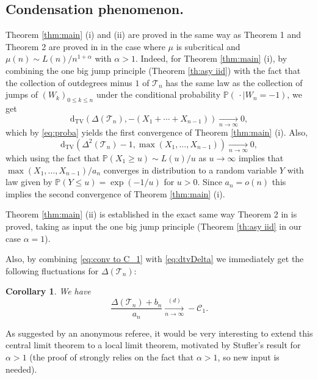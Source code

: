 \documentclass[a4paper,11pt]{article}
\DeclareRobustCommand{\P}{\mathbb{P}}
\DeclareRobustCommand{\to}{\xrightarrow[n\rightarrow \infty]{}}
\DeclareRobustCommand{\Cauchy}{\mathcal{C}_1}
\DeclareRobustCommand{\dist}{\xrightarrow[n \rightarrow \infty]{(d)}}
\DeclareRobustCommand{\dtv}{\mathrm{d}_{\mathrm{TV}}}
\newtheorem{corollary}[theorem]{Corollary}
\begin{document}
\subsection{Condensation phenomenon.} Theorem \ref{thm:main} (i) and (ii) are proved  in the same way as Theorem 1 and Theorem 2 are proved in \cite{Kortchemski_2013} in the case where $\mu$ is subcritical and $\mu(n) \sim L(n)/n^{1+\alpha}$ with $\alpha>1$. Indeed, for Theorem \ref{thm:main} (i), by combining the one big jump principle (Theorem \ref{th:asy iid}) with the fact that the collection of outdegrees minus $1$ of $ \mathcal{T}_{n}$ has the same law as the collection of jumps of $(W_{k})_{0 \leq k \leq n}$ under the conditional probability $\P(\, \cdot \mid W_{n}=-1)$, we get
\begin{equation}
\label{eq:dtvDelta}
\dtv \left( \Delta(\mathcal{T}_n), - (X_{1}+ \cdots +X_{n-1}) \right) \to 0,
\end{equation}
which by \eqref{eq:proba} yields the first convergence of Theorem \ref{thm:main} (i). Also,  
$$\dtv \left( \Delta^{2}(\mathcal{T}_n)-1, \max(X_{1}, \ldots,X_{n-1}) \right) \to 0,$$
which using the fact that $\P(X_{1} \geq u) \sim L(u)/u$ as $u \rightarrow \infty$ implies that $ \max(X_{1}, \ldots,X_{n-1})/a_{n}$ converges in distribution to a random variable $Y$ with law given by $\P(Y \leq u)=\exp(-1/u)$ for $u>0$. Since $a_{n}=o(n)$ this implies the second convergence of Theorem \ref{thm:main} (i).

Theorem \ref{thm:main} (ii) is established in the exact same way Theorem 2 in \cite{Kortchemski_2013} is proved, taking as input the one big jump principle (Theorem \ref{th:asy iid} in our case $\alpha=1$).

Also, by combining \eqref{eq:conv to C_1} with \eqref{eq:dtvDelta} we immediately get the following fluctuations for $\Delta(\mathcal{T}_n)$:

\begin{corollary}
\label{cor:fluctuations}
We have
$$            \frac{\Delta(\mathcal{T}_n)+b_n}{a_n} \dist -\Cauchy.$$
\end{corollary}

As suggested by an anonymous referee, it would be very interesting to extend this central limit theorem to a local limit theorem, motivated by Stufler's result \cite[Lemma 2.2]{Stu20} for $\alpha>1$ (the proof of \cite[Lemma 2.2]{Stu20} strongly relies on the fact that $\alpha>1$, so new input is needed). 
 
\end{document}
